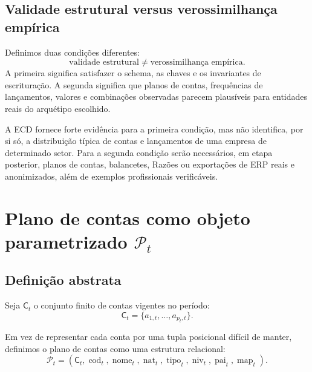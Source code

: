 \documentclass[11pt,a4paper]{article}
\newcommand{\Plano}{\mathcal{P}}
\newcommand{\cod}{\operatorname{cod}}
\newcommand{\nome}{\operatorname{nome}}
\newcommand{\nat}{\operatorname{nat}}
\newcommand{\tipo}{\operatorname{tipo}}
\newcommand{\niv}{\operatorname{niv}}
\newcommand{\pai}{\operatorname{pai}}
\newcommand{\map}{\operatorname{map}}
\begin{document}
\subsection{Validade estrutural versus verossimilhança empírica}

\begin{formalizacao}
Definimos duas condições diferentes:
\[
\boxed{
\text{validade estrutural}
\neq
\text{verossimilhança empírica}.
}
\]
A primeira significa satisfazer o schema, as chaves e os invariantes de escrituração. A segunda significa que planos de contas, frequências de lançamentos, valores e combinações observadas parecem plausíveis para entidades reais do arquétipo escolhido.
\end{formalizacao}

A ECD fornece forte evidência para a primeira condição, mas não identifica, por si só, a distribuição típica de contas e lançamentos de uma empresa de determinado setor. Para a segunda condição serão necessários, em etapa posterior, planos de contas, balancetes, Razões ou exportações de ERP reais e anonimizados, além de exemplos profissionais verificáveis.

\section[Plano de contas como objeto parametrizado]{Plano de contas como objeto parametrizado $\Plano_t$}

\subsection{Definição abstrata}

Seja $\mathsf C_t$ o conjunto finito de contas vigentes no período:
\begin{equation}
\boxed{\mathsf C_t=\{a_{1,t},\ldots,a_{p_t,t}\}.}
\end{equation}

Em vez de representar cada conta por uma tupla posicional difícil de manter, definimos o plano de contas como uma estrutura relacional:
\begin{equation}
\boxed{
\Plano_t=
(\mathsf C_t,\cod_t,\nome_t,\nat_t,\tipo_t,\niv_t,\pai_t,\map_t).
}
\label{eq:plan-structure}
\end{equation}
\end{document}
